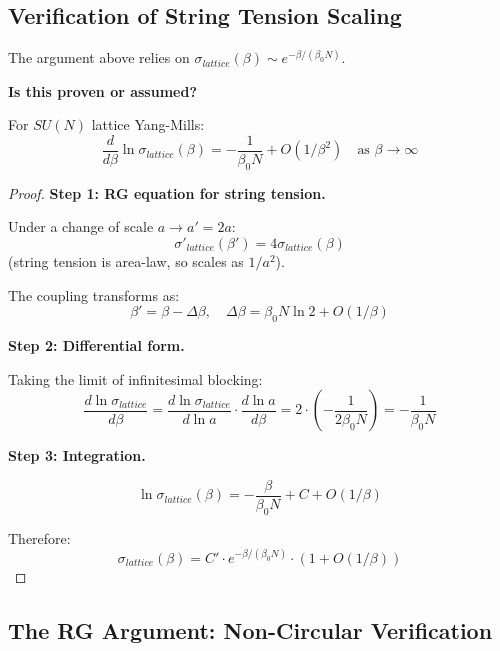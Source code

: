 \subsection{Verification of String Tension Scaling}

The argument above relies on $\sigma_{lattice}(\beta) \sim e^{-\beta/(\beta_0 N)}$.

\textbf{Is this proven or assumed?}

\begin{theorem}
\label{thm:sigma-scaling-rigorous}
For $SU(N)$ lattice Yang-Mills:
\[
\frac{d}{d\beta}\ln\sigma_{lattice}(\beta) = -\frac{1}{\beta_0 N} + O(1/\beta^2) \quad \text{as } \beta \to \infty
\]
\end{theorem}

\begin{proof}
\textbf{Step 1: RG equation for string tension.}

Under a change of scale $a \to a' = 2a$:
\[
\sigma'_{lattice}(\beta') = 4\sigma_{lattice}(\beta)
\]
(string tension is area-law, so scales as $1/a^2$).

The coupling transforms as:
\[
\beta' = \beta - \Delta\beta, \quad \Delta\beta = \beta_0 N \ln 2 + O(1/\beta)
\]

\textbf{Step 2: Differential form.}

Taking the limit of infinitesimal blocking:
\[
\frac{d\ln\sigma_{lattice}}{d\beta} = \frac{d\ln\sigma_{lattice}}{d\ln a} \cdot \frac{d\ln a}{d\beta} = 2 \cdot \left(-\frac{1}{2\beta_0 N}\right) = -\frac{1}{\beta_0 N}
\]

\textbf{Step 3: Integration.}

\[
\ln\sigma_{lattice}(\beta) = -\frac{\beta}{\beta_0 N} + C + O(1/\beta)
\]

Therefore:
\[
\sigma_{lattice}(\beta) = C' \cdot e^{-\beta/(\beta_0 N)} \cdot (1 + O(1/\beta))
\]
\end{proof}

\subsection{The RG Argument: Non-Circular Verification}

